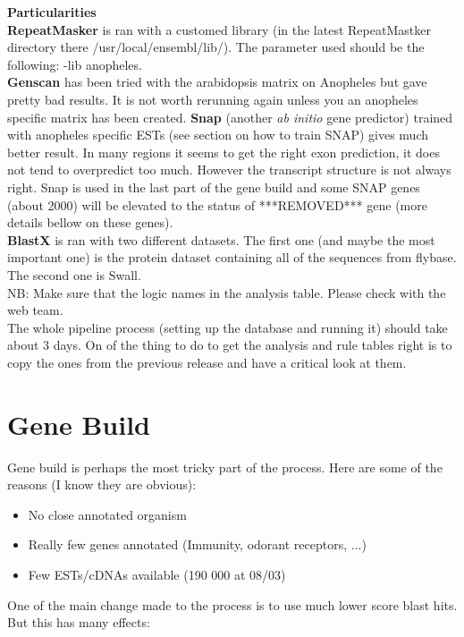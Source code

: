 \documentclass[a4paper,10pt]{article}
\begin{document}
\textbf{Particularities}\\
\textbf{RepeatMasker} is ran with a customed library (in the latest RepeatMastker directory there /usr/local/ensembl/lib/). The parameter used should be the following: \--lib anopheles.\\
\textbf{Genscan} has been tried with the arabidopsis matrix on Anopheles but gave pretty bad results. It is not worth rerunning again unless you an anopheles specific matrix has been created.
\textbf{Snap} (another \textit{ab initio} gene predictor) trained with anopheles specific ESTs (see section on how to train SNAP) gives much better result. In many regions it seems to get the right exon prediction, it does not tend to overpredict too much. However the transcript structure is not always right. Snap is used in the last part of the gene build and some SNAP genes (about 2000) will be elevated to the status of ***REMOVED*** gene (more details bellow on these genes).\\
\textbf{BlastX} is ran with two different datasets. The first one (and maybe the most important one) is the protein dataset containing all of the sequences from flybase. The second one is Swall.\\

NB: Make sure that the logic names in the analysis table. Please check with the web team.\\
The whole pipeline process (setting up the database and running it) should take about 3 days. On of the thing to do to get the analysis and rule tables right is to copy the ones from the previous release and have a critical look at them.

\section{Gene Build}
Gene build is perhaps the most tricky part of the process. Here are some of the reasons (I know they are obvious):
\begin{itemize}
\item No close annotated organism
\item Really few genes annotated (Immunity, odorant receptors, ...)
\item Few ESTs/cDNAs available (190 000 at 08/03)
\end{itemize}
One of the main change made to the process is to use much lower score blast hits. But this has many effects:
\end{document}
